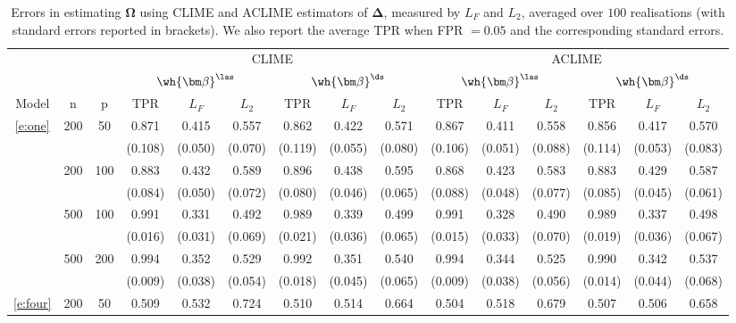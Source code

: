\begin{table}[htbp]
\caption{Errors in estimating $\bm\Omega$ using CLIME and ACLIME estimators of $\bm\Delta$, measured by $L_F$ and $L_2$, averaged over $100$ realisations (with standard errors reported in brackets).
We also report the average TPR when FPR $= 0.05$ and the corresponding standard errors.} 
\label{table:lrpc:omega}
\centering
\resizebox{\columnwidth}{!}
{\scriptsize 
\begin{tabular}{ccc cccccc cccccc}
\toprule 
 &  &  & \multicolumn{6}{c}{CLIME} &  \multicolumn{6}{c}{ACLIME} \\
 \cmidrule(lr){4-9}\cmidrule(lr){10-15}
 &  &  & \multicolumn{3}{c}{$\wh{\bm\beta}^{\las}$} & \multicolumn{3}{c}{$\wh{\bm\beta}^{\ds}$} & \multicolumn{3}{c}{$\wh{\bm\beta}^{\las}$} & \multicolumn{3}{c}{$\wh{\bm\beta}^{\ds}$}   \\
 \cmidrule(lr){4-6}\cmidrule(lr){7-9} \cmidrule(lr){10-12} \cmidrule(lr){13-15}
Model & n & p & TPR & $L_F$ & $L_2$ & TPR & $L_F$ & $L_2$ & TPR & $L_F$ & $L_2$ & TPR & $L_F$ & $L_2$ \\
\cmidrule(lr){1-3}\cmidrule(lr){4-9} \cmidrule(lr){10-15}
\ref{e:one} & 200 & 50 & 0.871 & 0.415 & 0.557 & 0.862 & 0.422 & 0.571 & 0.867 & 0.411 & 0.558 & 0.856 & 0.417 & 0.570 \\
 &  &  & (0.108) & (0.050) & (0.070) & (0.119) & (0.055) & (0.080) & (0.106) & (0.051) & (0.088) & (0.114) & (0.053) & (0.083) \\
 & 200 & 100 & 0.883 & 0.432 & 0.589 & 0.896 & 0.438 & 0.595 & 0.868 & 0.423 & 0.583 & 0.883 & 0.429 & 0.587 \\
 &  &  & (0.084) & (0.050) & (0.072) & (0.080) & (0.046) & (0.065) & (0.088) & (0.048) & (0.077) & (0.085) & (0.045) & (0.061) \\
 & 500 & 100 & 0.991 & 0.331 & 0.492 & 0.989 & 0.339 & 0.499 & 0.991 & 0.328 & 0.490 & 0.989 & 0.337 & 0.498 \\
 &  &  & (0.016) & (0.031) & (0.069) & (0.021) & (0.036) & (0.065) & (0.015) & (0.033) & (0.070) & (0.019) & (0.036) & (0.067) \\
 & 500 & 200 & 0.994 & 0.352 & 0.529 & 0.992 & 0.351 & 0.540 & 0.994 & 0.344 & 0.525 & 0.990 & 0.342 & 0.537 \\
 &  &  & (0.009) & (0.038) & (0.054) & (0.018) & (0.045) & (0.065) & (0.009) & (0.038) & (0.056) & (0.014) & (0.044) & (0.068) \\	\cmidrule(lr){1-15}
 \ref{e:four} & 200 & 50 & 0.509 & 0.532 & 0.724 & 0.510 & 0.514 & 0.664 & 0.504 & 0.518 & 0.679 & 0.507 & 0.506 & 0.658 \\

\end{tabular}}
\end{table}
